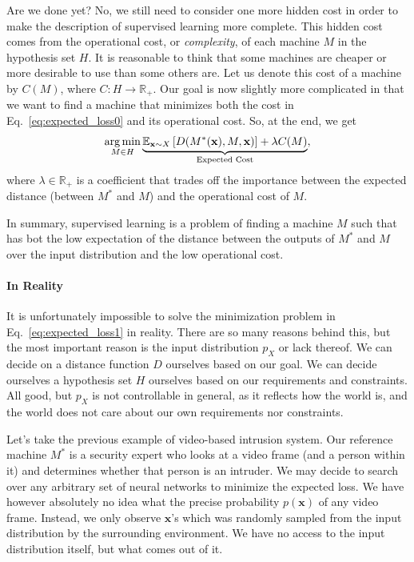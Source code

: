 \documentclass{report}
\newcommand{\vect}[1]{\mathbf{#1}}
\newcommand{\vx}[0]{\vect{x}}
\DeclareMathOperator*{\argmin}{\arg \min}
\begin{document}
Are we done yet? No, we still need to consider one more hidden cost in order to
make the description of supervised learning more complete. This hidden cost
comes from the operational cost, or {\it complexity}, of each machine $M$ in the
hypothesis set $H$.  It is reasonable to think that some machines are cheaper or
more desirable to use than some others are. Let us denote this cost of a machine
by $C(M)$, where $C: H \to \mathbb{R}_+$. Our goal is now slightly more
complicated in that we want to find a machine that minimizes both the cost in
Eq.~\eqref{eq:expected_loss0} and its operational cost. So, at the end, we get
\begin{align}
    \label{eq:expected_loss1}
    \argmin_{M \in H} \underbrace{\mathbb{E}_{\vx \sim X} \left[ D(M^*(\vx), M, \vx) \right]
        + \lambda C(M)
    }_{
        \mathclap{\text{Expected Cost}}
    },
\end{align}
where $\lambda \in \mathbb{R}_+$ is a coefficient that trades off the importance
between the expected distance (between $M^*$ and $M$) and the operational cost
of $M$.

In summary, supervised learning is a problem of finding a machine $M$ such that
has bot the low expectation of the distance between the outputs of $M^*$ and
$M$ over the input distribution and the low operational cost.

\paragraph{In Reality}

It is unfortunately impossible to solve the minimization problem in
Eq.~\eqref{eq:expected_loss1} in reality. There are so many reasons behind this,
but the most important reason is the input distribution $p_X$ or lack thereof.
We can decide on a distance function $D$ ourselves based on our goal. We can
decide ourselves a hypothesis set $H$ ourselves based on our requirements and
constraints. All good, but $p_X$ is not controllable in general, as it reflects
how the world is, and the world does not care about our own requirements nor
constraints.  

Let's take the previous example of video-based intrusion system. Our reference
machine $M^*$ is a security expert who looks at a video frame (and a person
within it) and determines whether that person is an intruder. We may decide to
search over any arbitrary set of neural networks to minimize the expected loss.
We have however absolutely no idea what the precise probability $p(\vx)$ of any
video frame. Instead, we only observe $\vx$'s which was randomly sampled from
the input distribution by the surrounding environment. We have no access to the
input distribution itself, but what comes out of it. 
\end{document}
